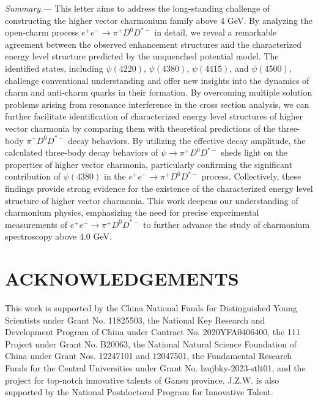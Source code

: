 \documentclass[prl,twocolumn,floatfix,amsmath,nofootinbib,amssymb,floatfix]{revtex4}
\begin{document}
{\noindent\it Summary.}---
This letter aims to address the long-standing challenge of constructing the higher vector charmonium family above 4 GeV. By analyzing the open-charm process $e^+e^-\to \pi^+ D^0 D^{*-}$ in detail, we reveal a remarkable agreement between the observed enhancement structures and the characterized energy level structure predicted by the unquenched potential model. The identified states, including $\psi(4220)$, $\psi(4380)$, $\psi(4415)$, and $\psi(4500)$, challenge conventional understanding and offer new insights into the dynamics of charm and anti-charm quarks in their formation.  By overcoming multiple solution problems arising from resonance interference in the cross section analysis, we can further facilitate identification of characterized energy level structures of higher vector charmonia by comparing them with theoretical predictions of the three-body  $\pi^+ D^0 D^{*-}$ decay behaviors. By utilizing the effective decay amplitude, the calculated three-body decay behaviors of $\psi \to \pi^+ D^0 D^{*-}$ sheds light on the properties of higher vector charmonia, particularly confirming the significant contribution of $\psi(4380)$ in the $e^+e^- \to\pi^+ D^0 D^{*-}$ process. Collectively, these findings provide strong evidence for the existence of the characterized energy level structure of higher vector charmonia. This work deepens our understanding of charmonium physics, emphasizing the need for precise experimental measurements of $e^+e^- \to\pi^+ D^0 D^{*-}$ to further advance the study of charmonium spectroscopy above 4.0 GeV.






\section*{ACKNOWLEDGEMENTS}

This work is supported by the China National Funds for Distinguished Young Scientists under Grant No. 11825503, the National Key Research and Development Program of China under Contract No. 2020YFA0406400, the 111 Project under Grant No. B20063, the National Natural Science Foundation of China under Grant Nos. 12247101 and 12047501, the Fundamental Research Funds for the Central Universities under Grant No. lzujbky-2023-stlt01, and the project for top-notch innovative talents of Gansu province. J.Z.W. is also supported by the National Postdoctoral Program for Innovative Talent.
\end{document}
